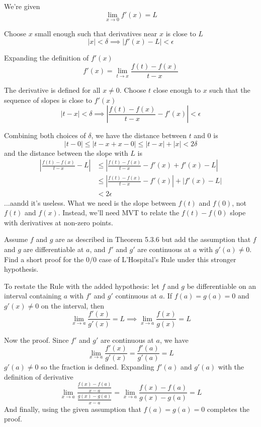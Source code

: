 \documentclass{oxmathproblems}
\begin{document}
\begin{questions}
\begin{solution}
  We're given
  \[\lim_{x \to 0}f'(x)=L\]

  Choose $x$ small enough such that derivatives near $x$ is close to $L$
  \[|x| < \delta \implies |f'(x)-L| < \epsilon\]

  Expanding the definition of $f'(x)$
  \[f'(x)=\lim_{t \to x} \frac{f(t)-f(x)}{t-x}\]
  
  The derivative is defined for all $x \neq 0$. Choose $t$ close enough to $x$ such that the sequence of slopes is close to $f'(x)$
  \[|t-x| < \delta \implies \left|\frac{f(t)-f(x)}{t-x} - f'(x)\right| < \epsilon\]
  
  Combining both choices of $\delta$, we have the distance between $t$ and $0$ is
  \[|t-0| \leq |t-x + x - 0| \leq |t-x| + |x| < 2\delta\]
  and the distance between the slope with $L$ is
  \begin{align*}
      \left|\frac{f(t)-f(x)}{t-x} - L\right| &\leq \left|\frac{f(t)-f(x)}{t-x} - f'(x) + f'(x) - L\right|\\
      &\leq \left|\frac{f(t)-f(x)}{t-x} - f'(x)\right| + |f'(x)-L|\\
      &< 2\epsilon
  \end{align*}
  ...aandd it's useless. What we need is the slope between $f(t)$ and $f(0)$, not $f(t)$ and $f(x)$. Instead, we'll need MVT to relate the $f(t)-f(0)$ slope with
  derivatives at non-zero points.
\end{solution}

\miquestion Assume $f$ and $g$ are as described in Theorem 5.3.6 but add the assumption that $f$ and $g$ are differentiable at $a$, and $f'$ and $g'$ are continuous at $a$ with
$g'(a) \neq 0$. Find a short proof for the $0/0$ case of L'Hospital's Rule under this stronger hypothesis.
\begin{solution}
  To restate the Rule with the added hypothesis: let $f$ and $g$ be differentiable on an interval containing $a$ with $f'$ and $g'$ continuous at $a$. If $f(a)=g(a)=0$
  and $g'(x) \neq 0$ on the interval, then
  \[\lim_{x \to a}\frac{f'(x)}{g'(x)} = L \implies \lim_{x \to a}\frac{f(x)}{g(x)}=L\]

  Now the proof. Since $f'$ and $g'$ are continuous at $a$, we have
  \[\lim_{x \to a}\frac{f'(x)}{g'(x)}=\frac{f'(a)}{g'(a)}=L\]
  $g'(a) \neq 0$ so the fraction is defined. Expanding $f'(a)$ and $g'(a)$ with the definition of derivative
  \[\lim_{x \to a}\frac{\frac{f(x)-f(a)}{x-a}}{\frac{g(x)-g(a)}{x-a}} = \lim_{x \to a}\frac{f(x)-f(a)}{g(x)-g(a)}=L\]
  And finally, using the given assumption that $f(a)=g(a)=0$ completes the proof.
\end{solution}


\end{questions}
\end{document}
